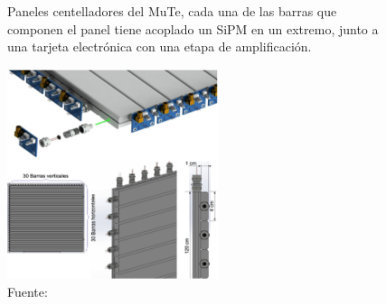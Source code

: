 \begin{figure}[h!]
\begin{centering}
  \caption{Paneles centelladores del MuTe, cada una de las barras que componen el panel tiene acoplado un SiPM en un extremo, junto a una tarjeta electrónica con una etapa de amplificación.}
  \includegraphics[width=0.55\textwidth]{Images/Panel.eps}
  \caption*{Fuente: \citep{MuTe_mec}}
  \label{fig:Hodoscopio}
  \par\end{centering}
\end{figure}